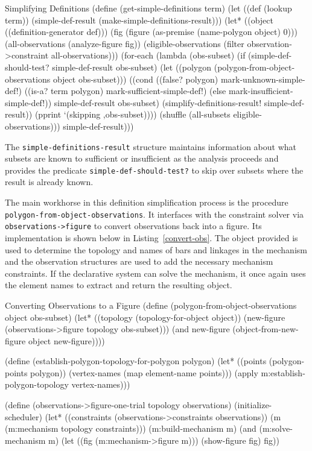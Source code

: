 \begin{code-listing}
[label=simple-def]
{Simplifying Definitions}
(define (get-simple-definitions term)
  (let ((def (lookup term))
        (simple-def-result (make-simple-definitions-result)))
    (let* ((object ((definition-generator def)))
           (fig (figure (as-premise (name-polygon object) 0)))
           (all-observations (analyze-figure fig))
           (eligible-observations
            (filter observation->constraint all-observations)))
      (for-each
       (lambda (obs-subset)
         (if (simple-def-should-test? simple-def-result obs-subset)
             (let ((polygon
                    (polygon-from-object-observations object obs-subset)))
               ((cond ((false? polygon) mark-unknown-simple-def!)
                      ((is-a? term polygon) mark-sufficient-simple-def!)
                      (else mark-insufficient-simple-def!))
                simple-def-result obs-subset)
               (simplify-definitions-result! simple-def-result))
             (pprint `(skipping ,obs-subset))))
       (shuffle (all-subsets eligible-observations)))
      simple-def-result)))
\end{code-listing}

The \texttt{simple-definitions-result} structure maintains information
about what subsets are known to sufficient or insufficient as the
analysis proceeds and provides the predicate
\texttt{simple-def-should-test?} to skip over subsets where the result
is already known.

The main workhorse in this definition simplification process is the
procedure \texttt{polygon-from-object-observations}. It interfaces
with the constraint solver via \texttt{observations->figure} to
convert observations back into a figure. Its implementation is shown
below in Listing~\ref{convert-obs}. The object provided is used to
determine the topology and names of bars and linkages in the mechanism
and the observation structures are used to add the necessary mechanism
constraints. If the declarative system can solve the mechanism, it
once again uses the element names to extract and return the resulting object.

\begin{code-listing}
[label=convert-obs]
{Converting Observations to a Figure}
(define (polygon-from-object-observations object obs-subset)
  (let* ((topology (topology-for-object object))
         (new-figure (observations->figure topology obs-subset)))
    (and new-figure (object-from-new-figure object new-figure))))

(define (establish-polygon-topology-for-polygon polygon)
  (let* ((points (polygon-points polygon))
         (vertex-names (map element-name points)))
    (apply m:establish-polygon-topology vertex-names)))

(define (observations->figure-one-trial topology observations)
  (initialize-scheduler)
  (let* ((constraints (observations->constraints observations))
         (m (m:mechanism topology constraints)))
    (m:build-mechanism m)
    (and (m:solve-mechanism m)
         (let ((fig (m:mechanism->figure m)))
           (show-figure fig)
           fig))
\end{code-listing}

